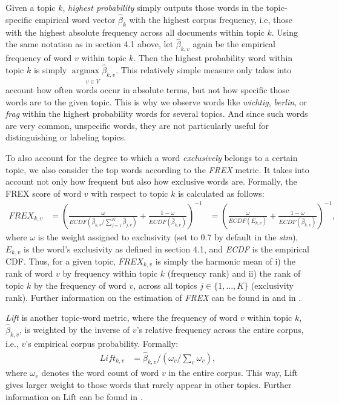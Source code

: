 Given a topic $k$, \textit{highest probability} simply outputs those words in the topic-specific empirical word vector $\hat{\beta}_{k}$ with the highest corpus frequency, i.e, those with the highest absolute frequency across all documents within topic $k$. Using the same notation as in section 4.1 above, let $\hat{\beta}_{k,v}$ again be the empirical frequency of word $v$ within topic $k$. Then the highest probability word within topic $k$ is simply $\underset{v \in V}{\operatorname{argmax}\hat{\beta}_{k,v}}$. This relatively simple measure only takes into account how often words occur in absolute terms, but not how specific those words are to the given topic. This is why we observe words like \textit{wichtig}, \textit{berlin}, or \textit{frag} within the highest probability words for several topics. And since such words are very common, unspecific words, they are not particularly useful for distinguishing or labeling topics.

To also account for the degree to which a word \textit{exclusively} belongs to a certain topic, we also consider the top words according to the \textit{FREX} metric. It takes into account not only how frequent but also how exclusive words are. Formally, the FREX score of word $v$ with respect to topic $k$ is calculated as follows:
\begin{align*}
FREX_{k,v} &= (\frac{\omega}{ECDF(\hat{\beta}_{k,v}/\sum_{j=1}^{K}\hat{\beta}_{j,v})} + \frac{1-\omega}{ECDF(\hat{\beta}_{k,v})})^{-1} &= (\frac{\omega}{ECDF(E_{k,v})} + \frac{1-\omega}{ECDF(\hat{\beta}_{k,v})})^{-1},
\end{align*}
where $\omega$ is the weight  assigned to exclusivity (set to 0.7 by default in the \textit{stm}), $E_{k,v}$ is the word's exclusivity as defined in section 4.1, and \textit{ECDF} is the empirical CDF. Thus, for a given topic, $FREX_{k,v}$ is simply the harmonic mean of i) the rank of word $v$ by frequency within topic $k$ (frequency rank) and ii) the rank of topic $k$ by the frequency of word $v$, across all topics $j \in \{1,...,K\}$ (exclusivity rank). Further information on the estimation of \textit{FREX} can be found in \cite{stm} and in \cite{bischof2012summarizing}.

\textit{Lift} is another topic-word metric, where the frequency of word $v$ within topic $k$,  $\hat{\beta}_{k,v}$, is weighted by the inverse of $v$'s relative frequency across the entire corpus, i.e., $v$'s empirical corpus probability. Formally:
\begin{align*}
Lift_{k,v} &= \hat{\beta}_{k,v}/(\omega_{v}/\sum_{v}\omega_{v}),
\end{align*}
where $\omega_{v}$ denotes the word count of word $v$ in the entire corpus. This way, Lift gives larger weight to those words that rarely appear in other topics. Further information on Lift can be found in \cite{taddy2012estimation}.

